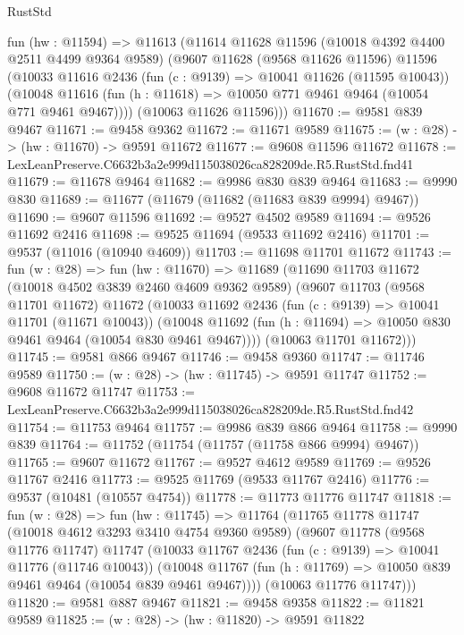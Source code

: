 \begin{lexlean}{RustStd}
\begin{coremodule}
  fun (hw : @11594) =>
  @11613
    (@11614
      @11628
      @11596
      (@10018 @4392 @4400 @2511 @4499 @9364 @9589)
      (@9607
        @11628
        (@9568 @11626 @11596)
        @11596
        (@10033
          @11616
          @2436
          (fun (c : @9139) => @10041 @11626 (@11595 @10043))
          (@10048 @11616 (fun (h : @11618) => @10050 @771 @9461 @9464 (@10054 @771 @9461 @9467))))
        (@10063 @11626 @11596)))
@11670 := @9581 @839 @9467
@11671 := @9458 @9362
@11672 := @11671 @9589
@11675 := (w : @28) -> (hw : @11670) -> @9591 @11672
@11677 := @9608 @11596 @11672
@11678 := LexLeanPreserve.C6632b3a2e999d115038026ca828209de.R5.RustStd.fnd41
@11679 := @11678 @9464
@11682 := @9986 @830 @839 @9464
@11683 := @9990 @830
@11689 := @11677 (@11679 (@11682 (@11683 @839 @9994) @9467))
@11690 := @9607 @11596
@11692 := @9527 @4502 @9589
@11694 := @9526 @11692 @2416
@11698 := @9525 @11694 (@9533 @11692 @2416)
@11701 := @9537 (@11016 (@10940 @4609))
@11703 := @11698 @11701 @11672
@11743 := fun (w : @28) =>
  fun (hw : @11670) =>
  @11689
    (@11690
      @11703
      @11672
      (@10018 @4502 @3839 @2460 @4609 @9362 @9589)
      (@9607
        @11703
        (@9568 @11701 @11672)
        @11672
        (@10033
          @11692
          @2436
          (fun (c : @9139) => @10041 @11701 (@11671 @10043))
          (@10048 @11692 (fun (h : @11694) => @10050 @830 @9461 @9464 (@10054 @830 @9461 @9467))))
        (@10063 @11701 @11672)))
@11745 := @9581 @866 @9467
@11746 := @9458 @9360
@11747 := @11746 @9589
@11750 := (w : @28) -> (hw : @11745) -> @9591 @11747
@11752 := @9608 @11672 @11747
@11753 := LexLeanPreserve.C6632b3a2e999d115038026ca828209de.R5.RustStd.fnd42
@11754 := @11753 @9464
@11757 := @9986 @839 @866 @9464
@11758 := @9990 @839
@11764 := @11752 (@11754 (@11757 (@11758 @866 @9994) @9467))
@11765 := @9607 @11672
@11767 := @9527 @4612 @9589
@11769 := @9526 @11767 @2416
@11773 := @9525 @11769 (@9533 @11767 @2416)
@11776 := @9537 (@10481 (@10557 @4754))
@11778 := @11773 @11776 @11747
@11818 := fun (w : @28) =>
  fun (hw : @11745) =>
  @11764
    (@11765
      @11778
      @11747
      (@10018 @4612 @3293 @3410 @4754 @9360 @9589)
      (@9607
        @11778
        (@9568 @11776 @11747)
        @11747
        (@10033
          @11767
          @2436
          (fun (c : @9139) => @10041 @11776 (@11746 @10043))
          (@10048 @11767 (fun (h : @11769) => @10050 @839 @9461 @9464 (@10054 @839 @9461 @9467))))
        (@10063 @11776 @11747)))
@11820 := @9581 @887 @9467
@11821 := @9458 @9358
@11822 := @11821 @9589
@11825 := (w : @28) -> (hw : @11820) -> @9591 @11822

\end{coremodule}
\end{lexlean}
